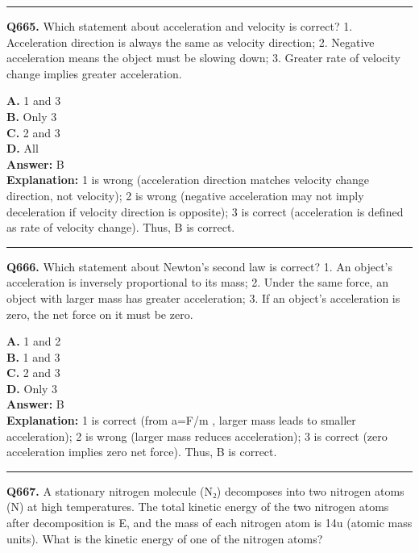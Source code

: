 \documentclass[12pt]{article}
\begin{document}
\hrule
\vspace{1em}


\noindent
\textbf{Q665.} Which statement about acceleration and velocity is correct?
1.
Acceleration direction is always the same as velocity direction;
2.
Negative acceleration means the object must be slowing down;
3.
Greater rate of velocity change implies greater acceleration.



\textbf{A.} 1 and 3 \\
\textbf{B.} Only 3 \\
\textbf{C.} 2 and 3 \\
\textbf{D.} All \\

\textbf{Answer:} B \\
\textbf{Explanation:} 1 is wrong (acceleration direction matches velocity change direction, not velocity); 2 is wrong (negative acceleration may not imply deceleration if velocity direction is opposite); 3 is correct (acceleration is defined as rate of velocity change). Thus, B is correct.

\hrule
\vspace{1em}


\noindent
\textbf{Q666.} Which statement about Newton’s second law is correct?
1.
An object’s acceleration is inversely proportional to its mass;
2.
Under the same force, an object with larger mass has greater acceleration;
3.
If an object’s acceleration is zero, the net force on it must be zero.



\textbf{A.} 1 and 2 \\
\textbf{B.} 1 and 3 \\
\textbf{C.} 2 and 3 \\
\textbf{D.} Only 3 \\

\textbf{Answer:} B \\
\textbf{Explanation:} 1 is correct (from
a=F/m
, larger mass leads to smaller acceleration); 2 is wrong (larger mass reduces acceleration); 3 is correct (zero acceleration implies zero net force). Thus, B is correct.

\hrule
\vspace{1em}


\noindent
\textbf{Q667.} A stationary nitrogen molecule (N₂) decomposes into two nitrogen atoms (N) at high temperatures. The total kinetic energy of the two nitrogen atoms after decomposition is E, and the mass of each nitrogen atom is 14u (atomic mass units). What is the kinetic energy of one of the nitrogen atoms?
\end{document}
